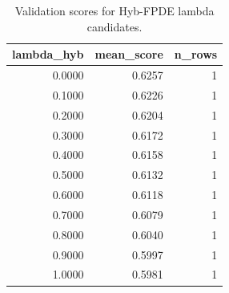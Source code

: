 \begin{table}[t]
\caption{Validation scores for Hyb-FPDE lambda candidates.}
\label{tab:lambda_distribution_computed}
\centering
\begin{tabular}{rrr}
\toprule
lambda\_hyb & mean\_score & n\_rows \\
\midrule
0.0000 & 0.6257 & 1 \\
0.1000 & 0.6226 & 1 \\
0.2000 & 0.6204 & 1 \\
0.3000 & 0.6172 & 1 \\
0.4000 & 0.6158 & 1 \\
0.5000 & 0.6132 & 1 \\
0.6000 & 0.6118 & 1 \\
0.7000 & 0.6079 & 1 \\
0.8000 & 0.6040 & 1 \\
0.9000 & 0.5997 & 1 \\
1.0000 & 0.5981 & 1 \\
\bottomrule
\end{tabular}

\end{table}
